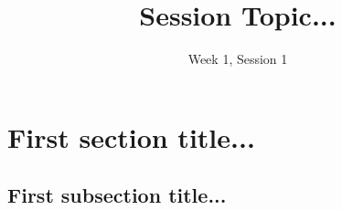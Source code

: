 \documentclass[11pt]{exam}
\title{Session Topic...}
\date{Week 1, Session 1}
\begin{document}
\maketitle
    
\vspace{10px}
\section{First section title...}
    
    \vspace{10px}
    \subsection{First subsection title...}
\end{document}

